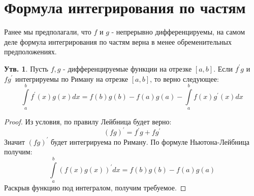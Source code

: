 \documentclass[12pt]{article}
\theoremstyle{definition}
\newtheorem{prop}{Утв.}
\newcommand{\ddint}[2]{\displaystyle\int\limits_{#1}^{#2}}
\begin{document}
\section*{Формула интегрирования по частям}
Ранее мы предполагали, что $f$ и $g$ - непрерывно дифференцируемы, на самом деле формула интегрирования по частям верна в менее обременительных предположениях.
\begin{prop}
	Пусть $f,g$ - дифференцируемые функции на отрезке $[a,b]$. Если $f^\prime g$ и $fg^\prime$ интегрируемы по Риману на отрезке $[a,b]$, то верно следующее:
	$$
		\ddint{a}{b}f^\prime(x)g(x)dx = f(b)g(b) - f(a)g(a) - \ddint{a}{b}f(x)g^\prime(x)dx	
	$$
\end{prop}
\begin{proof}
	Из условия, по правилу Лейбница будет верно:
	$$
		(fg)^\prime = f^\prime g + fg^\prime
	$$
	Значит $(fg)^\prime$ будет интегрируема по Риману. По формуле Ньютона-Лейбница получим:
	$$
		\ddint{a}{b}(f(x)g(x))^\prime dx = f(b)g(b) - f(a)g(a)
	$$
	Раскрыв функцию под интегралом, получим требуемое.
\end{proof}
\end{document}
